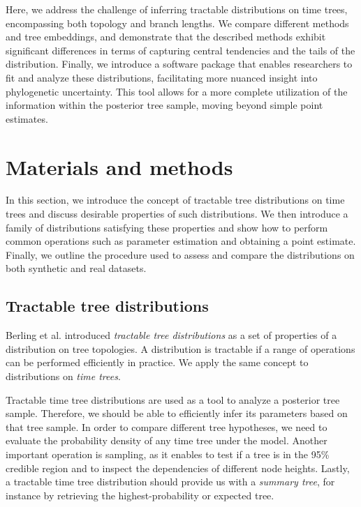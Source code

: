 \documentclass[10pt,letterpaper]{article}
\begin{document}
Here, we address the challenge of inferring tractable distributions on time trees, encompassing both topology and branch lengths. We compare different methods and tree embeddings, and demonstrate that the described methods exhibit significant differences in terms of capturing central tendencies and the tails of the distribution. Finally, we introduce a software package that enables researchers to fit and analyze these distributions, facilitating more nuanced insight into phylogenetic uncertainty. This tool allows for a more complete utilization of the information within the posterior tree sample, moving beyond simple point estimates.

\section*{Materials and methods}

In this section, we introduce the concept of tractable tree distributions on time trees and discuss desirable properties of such distributions. We then introduce a family of distributions satisfying these properties and show how to perform common operations such as parameter estimation and obtaining a point estimate. Finally, we outline the procedure used to assess and compare the distributions on both synthetic and real datasets.

\subsection*{Tractable tree distributions}

Berling et al. \cite{ccd} introduced \emph{tractable tree distributions} as a set of properties of a distribution on tree topologies. A distribution is tractable if a range of operations can be performed efficiently in practice. We apply the same concept to distributions on \emph{time trees}.

Tractable time tree distributions are used as a tool to analyze a posterior tree sample. Therefore, we should be able to efficiently infer its parameters based on that tree sample. In order to compare different tree hypotheses, we need to evaluate the probability density of any time tree under the model. Another important operation is sampling, as it enables to test if a tree is in the 95\% credible region and to inspect the dependencies of different node heights. Lastly, a tractable time tree distribution should provide us with a \emph{summary tree}, for instance by retrieving the highest-probability or expected tree.
\end{document}
